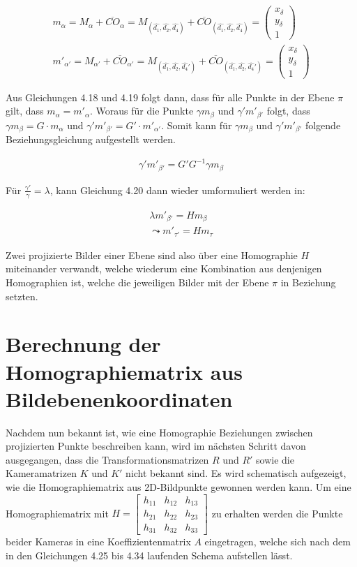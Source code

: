 \begin{gather}
	m_\alpha = M_\alpha + \overline{CO}_\alpha = M_{(\hat{d_1},\hat{d_2},\hat{d_4})} + \overline{CO}_{(\hat{d_1},\hat{d_2},\hat{d_4})} = \begin{pmatrix}
		x_\delta\\
		y_\delta\\
		1
	\end{pmatrix} \\
	m'_{\alpha'} = M_{\alpha'} + \overline{CO}_{\alpha'} = M_{(\hat{d_1},\hat{d_2},\hat{d_4}')} + \overline{CO}_{(\hat{d_1},\hat{d_2},\hat{d_4}')} = \begin{pmatrix}
	x_\delta\\
	y_\delta\\
	1
\end{pmatrix} 
\end{gather}

Aus Gleichungen 4.18 und 4.19 folgt dann, dass für alle Punkte in der Ebene $\pi$ gilt, dass $m_\alpha = m'_{\alpha}$. Woraus für die Punkte $\gamma m_\beta$ und $\gamma' m'_{\beta'}$ folgt, dass $\gamma m_\beta = G\cdot m_\alpha$ und $\gamma' m'_{\beta'} = G'\cdot m'_{\alpha'}$\cite{Elements}. Somit kann für $\gamma m_\beta$ und $\gamma' m'_{\beta'}$ folgende Beziehungsgleichung aufgestellt werden\cite{Elements}.

\begin{gather}
	\gamma' m'_{\beta'} = G' G^{-1} \gamma m_\beta
\end{gather}

Für $\frac{\gamma'}{\gamma} = \lambda$, kann Gleichung 4.20 dann wieder umformuliert werden in:

\begin{gather}
	\lambda m'_{\beta'} = H m_\beta\\
	\leadsto m'_{\tau'} = H m_\tau
\end{gather} 

Zwei projizierte Bilder einer Ebene sind also über eine Homographie $H$ miteinander verwandt, welche wiederum eine Kombination aus denjenigen Homographien ist, welche die jeweiligen Bilder mit der Ebene $\pi$ in Beziehung setzten\cite{Elements}.
 
\section{Berechnung der Homographiematrix aus Bildebenenkoordinaten}

Nachdem nun bekannt ist, wie eine Homographie Beziehungen zwischen projizierten Punkte beschreiben kann, wird im nächsten Schritt davon ausgegangen, dass die Transformationsmatrizen $R$ und $R'$ sowie die Kameramatrizen $K$ und $K'$ nicht bekannt sind. Es wird schematisch aufgezeigt, wie die Homographiematrix aus 2D-Bildpunkte gewonnen werden kann. Um eine Homographiematrix mit 
$H=
\begin{bmatrix}
h_{11}&h_{12}&h_{13}\\
h_{21}&h_{22}&h_{23}\\
h_{31}&h_{32}&h_{33}
\end{bmatrix}
$ zu erhalten werden die Punkte beider Kameras in eine Koeffizientenmatrix $A$ eingetragen, welche sich nach dem in den Gleichungen 4.25 bis 4.34 laufenden Schema aufstellen lässt. 

